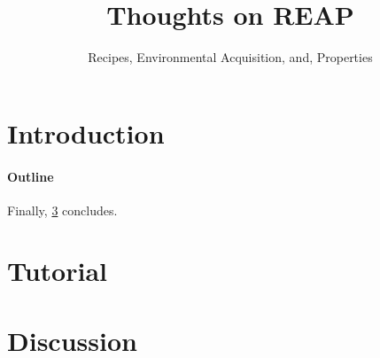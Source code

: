 \documentclass[preprint,10pt,nonatbib]{sigplanconf}
\title{Thoughts on REAP}
\subtitle{Recipes, Environmental Acquisition, and, Properties}
\begin{document}
\maketitle
\eject

\begin{flushright}
  \begin{minipage}{2.5in}
    \normalsize \rmfamily\scshape
    \color{red}{%
      suum cuique \newline
      Tu mortale, essere avvertiti. \newline
      Tu non Shallt Rimuovere \newline
      Questo comandamento \newline
      Mentre ci sono segni di Haste \newline
      in questo documento !!!! \newline
    }
  \end{minipage}
\end{flushright}

\begin{abstract}
  
\end{abstract}
\section{Introduction}


\paragraph{Outline}
Finally, \cref{section:zz} concludes.

\section{Tutorial}
\label{section:tutorial}


\section{Discussion}
\label{section:zz}


\small

\end{document}
